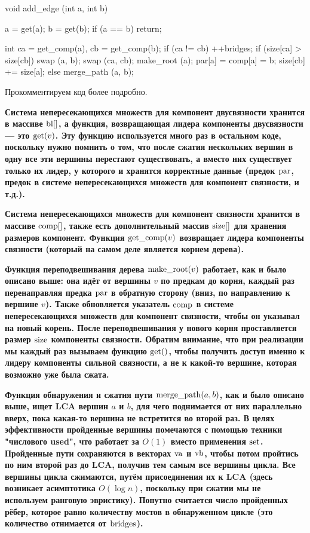 void add_edge (int a, int b) {
	a = get(a);   b = get(b);
	if (a == b)  return;

	int ca = get_comp(a),
		cb = get_comp(b);
	if (ca != cb) {
		++bridges;
		if (size[ca] > size[cb]) {
			swap (a, b);
			swap (ca, cb);
		}
		make_root (a);
		par[a] = comp[a] = b;
		size[cb] += size[a];
	}
	else
		merge_path (a, b);
}
\endcode


Прокомментируем код более подробно.

\bf{Система непересекающихся множеств для компонент двусвязности} хранится в массиве ${\rm bl}[]$, а функция, возвращающая лидера компоненты двусвязности --- это ${\rm get}(v)$. Эту функцию используется много раз в остальном коде, поскольку нужно помнить о том, что после сжатия нескольких вершин в одну все эти вершины перестают существовать, а вместо них существует только их лидер, у которого и хранятся корректные данные (предок ${\rm par}$, предок в системе непересекающихся множеств для компонент связности, и т.д.).

\bf{Система непересекающихся множеств для компонент связности} хранится в массиве ${\rm comp}[]$, также есть дополнительный массив ${\rm size}[]$ для хранения размеров компонент. Функция ${\rm get\_comp}(v)$ возвращает лидера компоненты связности (который на самом деле является корнем дерева).

\bf{Функция переподвешивания дерева} ${\rm make\_root}(v)$ работает, как и было описано выше: она идёт от вершины $v$ по предкам до корня, каждый раз перенаправляя предка $\rm par$ в обратную сторону (вниз, по направлению к вершине $v$). Также обновляется указатель ${\rm comp}$ в системе непересекающихся множеств для компонент связности, чтобы он указывал на новый корень. После переподвешивания у нового корня проставляется размер ${\rm size}$ компоненты связности. Обратим внимание, что при реализации мы каждый раз вызываем функцию ${\rm get}()$, чтобы получить доступ именно к лидеру компоненты сильной связности, а не к какой-то вершине, которая возможно уже была сжата.

\bf{Функция обнаружения и сжатия пути} ${\rm merge\_path}(a,b)$, как и было описано выше, ищет LCA вершин $a$ и $b$, для чего поднимается от них параллельно вверх, пока какая-то вершина не встретится во второй раз. В целях эффективности пройденные вершины помечаются с помощью техники "числового used", что работает за $O(1)$ вместо применения $\rm set$. Пройденные пути сохраняются в векторах $\rm va$ и $\rm vb$, чтобы потом пройтись по ним второй раз до LCA, получив тем самым все вершины цикла. Все вершины цикла сжимаются, путём присоединения их к LCA (здесь возникает асимптотика $O(\log n)$, поскольку при сжатии мы не используем ранговую эвристику). Попутно считается число пройденных рёбер, которое равно количеству мостов в обнаруженном цикле (это количество отнимается от $\rm bridges$).

